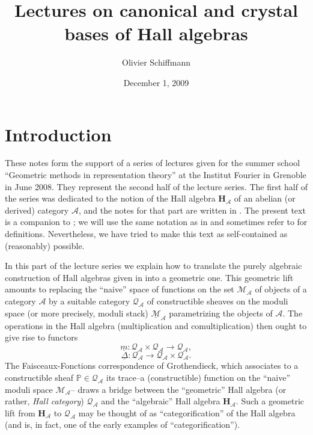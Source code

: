 \documentclass[a4paper,10pt]{amsart}
\title{Lectures on canonical and crystal bases of Hall algebras}
\author{Olivier Schiffmann}
\date{December 1, 2009}
\def\A{\mathcal{A}}
\numberwithin{equation}{section}
\begin{document}
\maketitle
\tableofcontents

\newpage


\section*{Introduction}

\vspace{.2in}

These notes form the support of a series of lectures given for the summer school ``Geometric methods in representation theory'' at the Institut Fourier  in Grenoble in June 2008. They represent the second half of the lecture series. The first half of the series was dedicated to the notion of the Hall algebra $\mathbf{H}_\A$ of an abelian (or derived) category $\A$, and the notes for that part are written in \cite{Trieste}. The present text is a companion to \cite{Trieste}; we will use the same notation as in \cite{Trieste} and sometimes refer to \cite{Trieste} for definitions. Nevertheless, we have tried to make this text as self-contained as (reasonably) possible.

\vspace{.1in}

In this part of the lecture series we explain how to translate the purely algebraic construction of Hall algebras given in \cite{Trieste} into a geometric one. This geometric lift amounts to replacing the ``naive'' space of functions on the set $\mathcal{M}_{\A}$ of objects of a category $\A$ by a suitable category $\mathcal{Q}_{\A}$ of constructible sheaves on the moduli space (or more precisely, moduli stack) $\underline{\mathcal{M}}_{\A}$ parametrizing the objects of $\A$. The operations in the Hall algebra (multiplication and comultiplication) then ought to give rise to functors
$$\underline{m}:  \mathcal{Q}_{\A} \times \mathcal{Q}_{\A} \to \mathcal{Q}_{\A},$$
$$\underline{\Delta}: \mathcal{Q}_{\A} \to \mathcal{Q}_{\A} \times \mathcal{Q}_{\A}.$$
 The Faisceaux-Fonctions correspondence of Grothendieck, which associates to a constructible sheaf $\mathbb{P} \in {\mathcal{Q}}_{\A}$ its trace--a (constructible) function on the ``naive'' moduli space $\mathcal{M}_{\A}$--  draws a bridge between the ``geometric'' Hall algebra (or rather, \textit{Hall category}) $\mathcal{Q}_{\A}$ and the ``algebraic'' Hall algebra $\mathbf{H}_{\A}$.  Such a geometric lift from $\mathbf{H}_{\A}$ to $\mathcal{Q}_{\A}$ may be thought of as ``categorification'' of the Hall algebra (and is, in fact, one of the early examples of ``categorification'').
 
\end{document}
